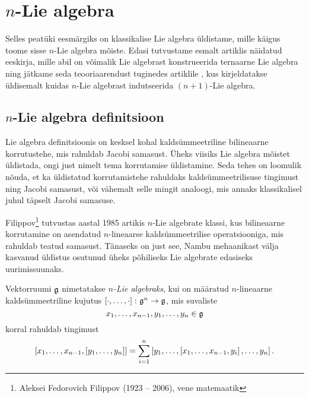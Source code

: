 

\section{\texorpdfstring{$n$}\ -Lie algebra}

Selles peatüki eesmärgiks on klassikalise Lie algebra
üldistame, mille käigus toome sisse $n$-Lie algebra mõiste.
Edasi tutvustame esmalt artiklis \cite{AMS:2011} näidatud eeskirja,
mille abil on võimalik Lie algebrast konstrueerida
ternaarne Lie algebra ning jätkame seda teooriaarendust
tuginedes artiklile \cite{AKMS:2014}, kus kirjeldatakse
üldisemalt kuidas $n$-Lie algebrast indutseerida $(n+1)$-Lie
algebra.

\subsection{\texorpdfstring{$n$}\ -Lie algebra definitsioon}

Lie algebra definitsioonis on kesksel kohal kaldsümmeetriline
bilineaarne korrutustehe, mis rahuldab Jacobi samasust.
Üheks viisiks Lie algebra mõistet üldistada, ongi just nimelt
tema korrutamise üldistamine. Seda tehes on loomulik nõuda, et
ka üldistatud korrutamistehe rahuldaks kaldsümmeetrilisuse
tingimust ning Jacobi samasust, või vähemalt selle mingit
analoogi, mis annaks klassikalisel juhul täpselt
Jacobi samasuse.

Filippov\footnote{Aleksei Fedorovich Filippov (1923 -- 2006),
vene matemaatik} tutvustas aastal 1985 artikis \cite{filippov1985}
$n$-Lie algebrate klassi, kus bilineaarne korrutamine on
asendatud $n$-lineaarse kaldsümmeetrilise operatsiooniga,
mis rahuldab teatud samasust.\cite{kasymov1987}
Tänaseks on just see, Nambu mehaanikast välja kasvanud
üldistus osutunud üheks põhiliseks Lie algebrate edasiseks
uurimissuunaks.

\begin{dfn}
    Vektorruumi $\mathfrak{g}$ nimetatakse \emph{$n$-Lie algebraks}, kui
    on määratud $n$-lineaarne kaldsümmeetriline kujutus
    $\left[ \cdot, \dots, \cdot \right] \colon \mathfrak{g}^n \to \mathfrak{g}$, mis
    suvaliste
    \[ x_1, \dots, x_{n-1}, y_1, \dots, y_n \in \mathfrak{g} \]
    korral rahuldab tingimust
    \begin{align}\label{id:filippov}
        \left[ x_1, \dots, x_{n-1}, \left[ y_1, \dots, y_n \right] \right] =
        \sum_{i=1}^n \left[
            y_1, \dots, \left[ x_1, \dots, x_{n-1}, y_i \right], \dots, y_n
        \right].
    \end{align}
\end{dfn}

